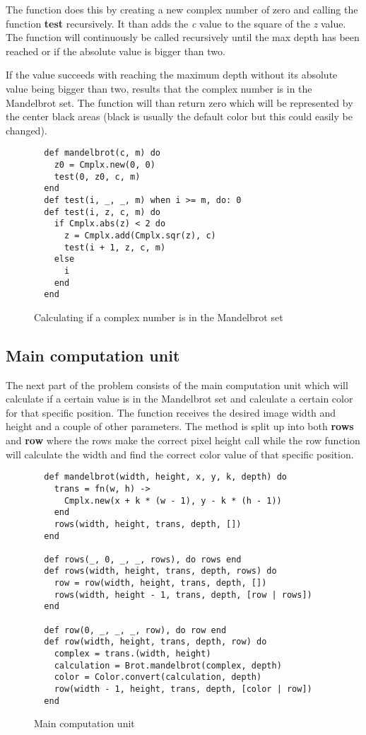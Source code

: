 \documentclass[a4paper,11pt]{article}
\begin{document}
The function does this by creating a new complex number of zero and calling the function \textbf{test} recursively. It than adds the \textit{c} value to the square of the \textit{z} value. The function will continuously be called recursively until the max depth has been reached or if the absolute value is bigger than two.

If the value succeeds with reaching the maximum depth without its absolute value being bigger than two, results that the complex number is in the Mandelbrot set. The function will than return zero which will be represented by the center black areas (black is usually the default color but this could easily be changed).

\begin{figure}[H]
\begin{verbatim}
  def mandelbrot(c, m) do
    z0 = Cmplx.new(0, 0)
    test(0, z0, c, m)
  end
  def test(i, _, _, m) when i >= m, do: 0
  def test(i, z, c, m) do
    if Cmplx.abs(z) < 2 do
      z = Cmplx.add(Cmplx.sqr(z), c)
      test(i + 1, z, c, m)
    else
      i
    end
  end
\end{verbatim}
\caption{Calculating if a complex number is in the Mandelbrot set}
\label{Figure:2}
\end{figure}

\subsection*{Main computation unit}
The next part of the problem consists of the main computation unit which will calculate if a certain value is in the Mandelbrot set and calculate a certain color for that specific position. The function receives the desired image width and height and a couple of other parameters. The method is split up into both \textbf{rows} and \textbf{row} where the rows make the correct pixel height call while the row function will calculate the width and find the correct color value of that specific position.

\begin{figure}[H]
\begin{verbatim}
  def mandelbrot(width, height, x, y, k, depth) do
    trans = fn(w, h) ->
      Cmplx.new(x + k * (w - 1), y - k * (h - 1))
    end
    rows(width, height, trans, depth, [])
  end

  def rows(_, 0, _, _, rows), do rows end
  def rows(width, height, trans, depth, rows) do
    row = row(width, height, trans, depth, [])
    rows(width, height - 1, trans, depth, [row | rows])
  end

  def row(0, _, _, _, row), do row end
  def row(width, height, trans, depth, row) do
    complex = trans.(width, height)
    calculation = Brot.mandelbrot(complex, depth)
    color = Color.convert(calculation, depth)
    row(width - 1, height, trans, depth, [color | row])
  end
\end{verbatim}
\caption{Main computation unit}
\label{Figure:3}
\end{figure}
\end{document}
